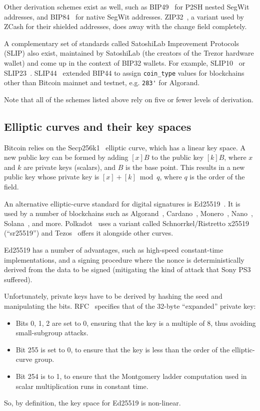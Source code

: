 \documentclass[12pt, a4paper, twocolumn]{article}
\begin{document}
Other derivation schemes exist as well, such as BIP49~\cite{BIP49} for P2SH nested SegWit addresses, and BIP84~\cite{BIP84} for native SegWit addresses. ZIP32~\cite{ZIP32}, a variant used by ZCash for their shielded addresses, does away with the change field completely.

A complementary set of standards called SatoshiLab Improvement Protocols (SLIP) also exist, maintained by SatoshiLab (the creators of the Trezor hardware wallet) and come up in the context of BIP32 wallets.
For example, SLIP10~\cite{SLIP10} or SLIP23~\cite{SLIP23}.
SLIP44~\cite{BIP44} extended BIP44 to assign \verb=coin_type= values for blockchains other than Bitcoin mainnet and testnet, e.g. \verb=283'= for Algorand.

Note that all of the schemes listed above rely on five or fewer levels of derivation.

\subsection{Elliptic curves and their key spaces}
\label{subsec:elliptic_curves_and_their_key_spaces}

Bitcoin relies on the Secp256k1~\cite{Secp256k1} elliptic curve, which has a linear key space.
A new public key can be formed by adding $[x]B$ to the public key $[k]B$, where $x$ and $k$ are private keys (scalars), and $B$ is the base point.
This results in a new public key whose private key is $[x] + [k] \bmod q$, where $q$ is the order of the field.

An alternative elliptic-curve standard for digital signatures is Ed25519~\cite{Ed25519}.
It is used by a number of blockchains such as Algorand~\cite{AlgorandEd25519}, Cardano~\cite{CardanoEd25519}, Monero~\cite{MoneroEd25519}, Nano~\cite{NanoEd25519}, Solana~\cite{SolanaEd25519}, and more.
Polkadot~\cite{PolkadotEd25519} uses a variant called Schnorrkel/Ristretto x25519 (``sr25519'') and Tezos~\cite{TezosEd25519} offers it alongside other curves.

Ed25519 has a number of advantages, such as high-speed constant-time implementations, and a signing procedure where the nonce is deterministically derived from the data to be signed (mitigating the kind of attack that Sony PS3 suffered).

Unfortunately, private keys have to be derived by hashing the seed and manipulating the bits.
RFC~\cite{RFC8032} specifies that of the 32-byte ``expanded'' private key:
\begin{itemize}[label=\textendash, itemsep=-0.5em]
\item Bits 0, 1, 2 are set to 0, ensuring that the key is a multiple of 8, thus avoiding small-subgroup attacks.
\item Bit 255 is set to 0, to ensure that the key is less than the order of the elliptic-curve group.
\item Bit 254 is to 1, to ensure that the Montgomery ladder computation used in scalar multiplication runs in constant time.
\end{itemize}
So, by definition, the key space for Ed25519 is non-linear.
\end{document}
